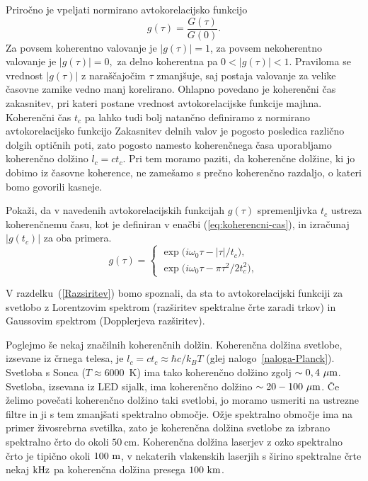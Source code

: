 Priročno je vpeljati normirano avtokorelacijsko funkcijo 
\begin{equation}
g(\tau)=\frac{G(\tau)}{G(0)}.
\label{eq:avtokorelacija-norm}
\end{equation}
Za povsem koherentno valovanje je $|g(\tau)|=1$, za povsem nekoherentno
valovanje je $|g(\tau)|=0,$ za delno koherentna  pa $0<|g(\tau)|<1$.
Praviloma se vrednost $|g(\tau)|$ z naraščajočim $\tau$ zmanjšuje,
saj postaja valovanje za velike časovne zamike vedno manj korelirano.
Ohlapno povedano je koherenčni čas zakasnitev, pri kateri postane
vrednost avtokorelacijske funkcije majhna.
Koherenčni čas $t_{c}$ pa lahko tudi bolj natančno definiramo 
z normirano avtokorelacijsko funkcijo
Zakasnitev delnih valov je pogosto posledica
različno dolgih optičnih poti, zato pogosto namesto koherenčnega časa uporabljamo
koherenčno dolžino $l_{c}=ct_{c}$. 
Pri tem moramo paziti, da koherenčne dolžine, ki jo dobimo iz časovne 
koherence, ne zamešamo s prečno koherenčno
razdaljo, o kateri bomo govorili kasneje.

\begin{definition}
Pokaži, da v navedenih avtokorelacijskih
funkcijah $g(\tau)$ spremenljivka $t_{c}$ ustreza koherenčnemu času,
kot je definiran v enačbi (\ref{eq:koherencni-cas}), in izračunaj $|g(t_{c})|$ za oba primera.
\begin{equation}
g(\tau)=\begin{cases}
\exp\big(i\omega_{0}\tau-\left|\tau\right|/t_{c}\big),\\
\exp\big(i\omega_{0}\tau-\pi\tau^{2}/2t_{c}^{2}\big),
\end{cases}
\label{eq:gauss-eksponent}
\end{equation}

V razdelku~(\ref{Razsiritev}) bomo spoznali, da sta to avtokorelacijski
funkciji za svetlobo z Lorentzovim spektrom
(razširitev spektralne črte zaradi trkov) in Gaussovim spektrom
(Dopplerjeva razširitev).
\end{definition}

Poglejmo še nekaj značilnih koherenčnih dolžin. 
Koherenčna dolžina svetlobe, izsevane iz črnega telesa, je $l_{c}=ct_{c}\approx 
\hbar c/k_{B}T$ (glej nalogo~\ref{naloga-Planck}). Svetloba s Sonca ($T \approx 6000$~K)
ima tako koherenčno dolžino zgolj $\sim 0,4~\micro\metre$. Svetloba,
izsevana iz LED sijalk, ima koherenčno dolžino $\sim20-100~\micro\metre$.
Če želimo povečati koherenčno dolžino taki svetlobi, jo moramo usmeriti
na ustrezne filtre in ji s tem zmanjšati spektralno območje.
Ožje spektralno območje ima na primer živosrebrna svetilka, zato je koherenčna
dolžina svetlobe za izbrano spektralno črto do okoli $50~\mathrm{cm}$.
Koherenčna dolžina laserjev z ozko spektralno črto je tipično okoli
$100~\metre$, v nekaterih vlakenskih laserjih s širino spektralne
črte nekaj $\kilo\hertz$ pa koherenčna dolžina presega $100~\kilo\metre$.

